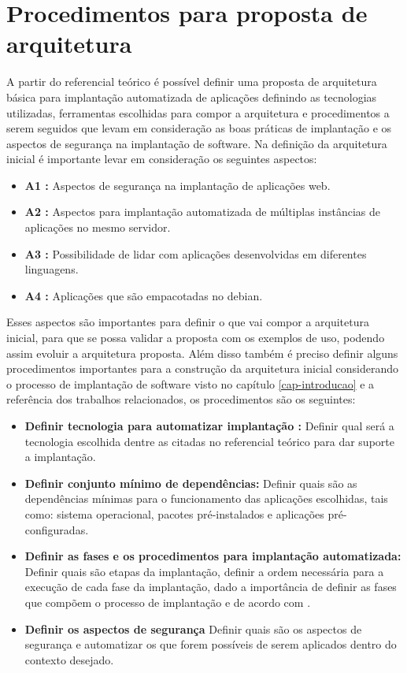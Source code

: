 \section{Procedimentos para proposta de arquitetura}

A partir do referencial teórico é possível definir uma proposta de
arquitetura básica para implantação automatizada de aplicações definindo as
tecnologias utilizadas, ferramentas escolhidas para compor a arquitetura e procedimentos
a serem seguidos que levam em consideração as boas práticas de implantação e os
aspectos de segurança na implantação de software. Na definição da arquitetura inicial
é importante levar em consideração os seguintes aspectos:

\begin{itemize}
  \item  \textbf{A1 :} Aspectos de segurança na implantação de aplicações web.
  \item  \textbf{A2 :} Aspectos para implantação automatizada de múltiplas instâncias de
   aplicações no mesmo servidor.
  \item  \textbf{A3 :} Possibilidade de lidar com aplicações desenvolvidas em
  diferentes linguagens.
  \item  \textbf{A4 :} Aplicações que são empacotadas no debian.
\end{itemize}

Esses aspectos são importantes para definir o que vai compor a arquitetura inicial,
para que se possa validar a proposta com os exemplos de uso,
podendo assim evoluir a arquitetura proposta. Além disso também é preciso definir
alguns procedimentos importantes para a construção da arquitetura inicial
considerando o processo de implantação de software visto no
capítulo \ref{cap-introducao} e a referência dos trabalhos relacionados, os procedimentos
são os seguintes:

\begin{itemize}
  \item  \textbf{Definir tecnologia para automatizar implantação :}  Definir qual será a
  tecnologia escolhida dentre as citadas no referencial teórico para dar suporte
  a implantação.
  \item  \textbf{Definir conjunto mínimo de dependências:} Definir quais são as dependências
  mínimas para o funcionamento das aplicações escolhidas, tais como: sistema operacional,
  pacotes pré-instalados e aplicações pré-configuradas.
  \item  \textbf{Definir as fases e os procedimentos para implantação automatizada:}
   Definir quais são etapas da implantação, definir a ordem necessária para a execução de
  cada fase da implantação, dado a importância de definir as fases que compõem o processo de
  implantação e de acordo com \cite{omg2006}.
  \item  \textbf{Definir os aspectos de segurança} Definir quais são os aspectos de segurança
  e automatizar os que forem possíveis de serem aplicados dentro do contexto desejado.
\end{itemize}

